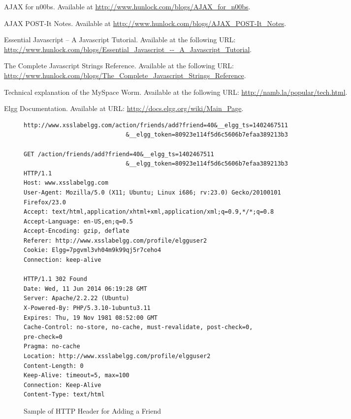 \begin{thebibliography}{10}

\newblock AJAX for n00bs. Available at {\footnotesize \url{http://www.hunlock.com/blogs/AJAX_for_n00bs}}.

\newblock AJAX POST-It Notes.
\newblock Available at {\footnotesize \url{http://www.hunlock.com/blogs/AJAX_POST-It_Notes}}.

\newblock Essential Javascript -- A Javascript Tutorial.
\newblock Available at the following URL:\\
{\footnotesize \url{http://www.hunlock.com/blogs/Essential_Javascript_--_A_Javascript_Tutorial}}.

\newblock The Complete Javascript Strings Reference.
\newblock Available at the following URL:\\
{\footnotesize \url{http://www.hunlock.com/blogs/The_Complete_Javascript_Strings_Reference}}.

\newblock Technical explanation of the MySpace Worm.
\newblock Available at the following URL: \url{http://namb.la/popular/tech.html}.

\newblock Elgg Documentation. Available at URL: \url{http://docs.elgg.org/wiki/Main_Page}.

\end{thebibliography}


\begin{figure}[b]
{\footnotesize
\begin{Verbatim}[frame=single]
http://www.xsslabelgg.com/action/friends/add?friend=40&__elgg_ts=1402467511
                             &__elgg_token=80923e114f5d6c5606b7efaa389213b3

GET /action/friends/add?friend=40&__elgg_ts=1402467511
                             &__elgg_token=80923e114f5d6c5606b7efaa389213b3
HTTP/1.1
Host: www.xsslabelgg.com
User-Agent: Mozilla/5.0 (X11; Ubuntu; Linux i686; rv:23.0) Gecko/20100101
Firefox/23.0
Accept: text/html,application/xhtml+xml,application/xml;q=0.9,*/*;q=0.8
Accept-Language: en-US,en;q=0.5
Accept-Encoding: gzip, deflate
Referer: http://www.xsslabelgg.com/profile/elgguser2
Cookie: Elgg=7pgvml3vh04m9k99qj5r7ceho4
Connection: keep-alive

HTTP/1.1 302 Found
Date: Wed, 11 Jun 2014 06:19:28 GMT
Server: Apache/2.2.22 (Ubuntu)
X-Powered-By: PHP/5.3.10-1ubuntu3.11
Expires: Thu, 19 Nov 1981 08:52:00 GMT
Cache-Control: no-store, no-cache, must-revalidate, post-check=0,
pre-check=0
Pragma: no-cache
Location: http://www.xsslabelgg.com/profile/elgguser2
Content-Length: 0
Keep-Alive: timeout=5, max=100
Connection: Keep-Alive
Content-Type: text/html
\end{Verbatim}
}
\caption{Sample of HTTP Header for Adding a Friend}
\label{fig:livehttptext}
\end{figure}

